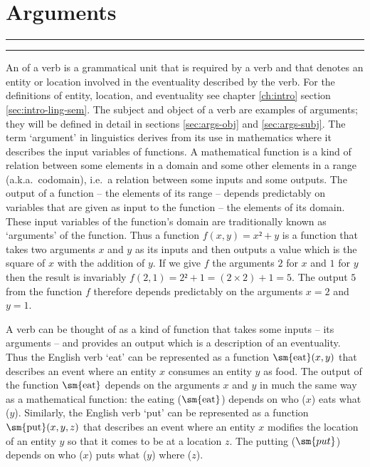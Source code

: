 
\resetexcnt
\chapter{Arguments}\label{ch:args}

\startcontents[chapters]
\noindent\rule[0.5em]{\textwidth}{\heavyrulewidth}
\noindent\rule{\textwidth}{\heavyrulewidth}
\vspace{1\baselineskip}


An  of a verb is a grammatical unit that is required by a verb and that denotes an entity or location involved in the eventuality described by the verb. For the definitions of entity, location, and eventuality see chapter \ref{ch:intro} section \ref{sec:intro-ling-sem}. The subject and object of a verb are examples of arguments; they will be defined in detail in sections \ref{sec:args-obj} and \ref{sec:args-subj}. The term ‘argument’ in linguistics derives from its use in mathematics where it describes the input variables of functions. A mathematical function is a kind of relation between some elements in a domain and some other elements in a range (a.k.a.\ codomain), i.e.\ a relation between some inputs and some outputs. The output of a function – the elements of its range – depends predictably on variables that are given as input to the function – the elements of its domain. These input variables of the function’s domain are traditionally known as ‘arguments’ of the function. Thus a function $f(x, y) = x² + y$ is a function that takes two arguments $x$ and $y$ as its inputs and then outputs a value which is the square of $x$ with the addition of $y$. If we give $f$ the arguments $2$ for $x$ and $1$ for $y$ then the result is invariably $f(2, 1) = 2² + 1 = (2 × 2) + 1 = 5$. The output $5$ from the function $f$ therefore depends predictably on the arguments $x = 2$ and $y = 1$.

A verb can be thought of as a kind of function that takes some inputs – its arguments – and provides an output which is a description of an eventuality. Thus the English verb ‘eat’ can be represented as a function $\text{\sm{eat}}(x, y)$ that describes an event where an entity $x$ consumes an entity $y$ as food. The output of the function $\text{\sm{eat}}$ depends on the arguments $x$ and $y$ in much the same way as a mathematical function: the eating ($\text{\sm{eat}}$) depends on who ($x$) eats what ($y$). Similarly, the English verb ‘put’ can be represented as a function $\text{\sm{put}}(x, y, z)$ that describes an event where an entity $x$ modifies the location of an entity $y$ so that it comes to be at a location $z$. The putting ($\sm{put}$) depends on who ($x$) puts what ($y$) where ($z$).

